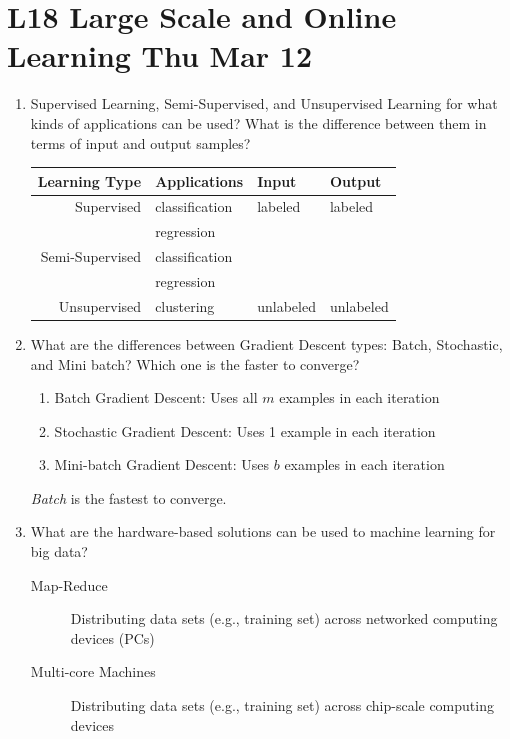 \documentclass[12pt]{article}
\newenvironment{QandA}{\begin{enumerate}[label=\bfseries\arabic*.]\bfseries}
{\end{enumerate}}
\newenvironment{answered}{\par\normalfont\color{Sepia}}{}
\begin{document}
\section*{L18 Large Scale and Online Learning  \textemdash{} Thu Mar 12}
\begin{QandA}
    
    \item Supervised Learning, Semi-Supervised, and Unsupervised Learning
          for what kinds of applications can be used?
          \color{red}What is the difference between them in terms of input and output samples?
    \color{black}
    \begin{answered}
        \begin{tabular}{ r | l l l }
        \hline
        Learning Type   & Applications    & Input & Output\\
        \hline
            Supervised  & classification  & labeled      &  labeled     \\
                        & regression      &       &       \\
        \hdashline
        Semi-Supervised & classification  &       &       \\
                        & regression      &       &       \\
        \hdashline
           Unsupervised & clustering      & unlabeled      & unlabeled      \\
        \end{tabular}

    \end{answered}


    \item What are the differences between Gradient Descent types: Batch, Stochastic, and Mini batch?
          Which one is the faster to converge?
    \begin{answered}
        \begin{enumerate}
            \item Batch Gradient Descent: Uses all $m$ examples in each iteration
            \item Stochastic Gradient Descent: Uses 1 example in each iteration
            \item Mini-batch Gradient Descent: Uses $b$ examples in each iteration
        \end{enumerate}
        \textit{Batch} is the fastest to converge.
    \end{answered}

    \item What are the hardware-based solutions can be used to machine learning for big data?
    \begin{answered}
        \begin{description}
            \item[Map-Reduce] Distributing data sets (e.g., training set) across networked computing devices (PCs)
            \item[Multi-core Machines] Distributing data sets (e.g., training set) across chip-scale computing devices
        \end{description}
    \end{answered}


\end{QandA}
\end{document}

